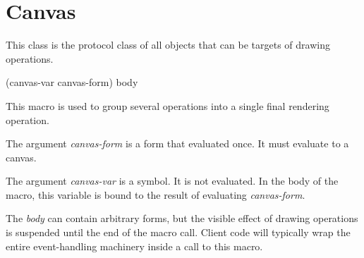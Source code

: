 \chapter{Canvas}
\label{chap-canvas}


This class is the protocol class of all objects that can be targets of
drawing operations.

 {(canvas-var canvas-form) \body body}

This macro is used to group several operations into a single final
rendering operation.

The argument \textit{canvas-form} is a form that evaluated once.  It
must evaluate to a canvas.

The argument \textit{canvas-var} is a symbol.  It is not evaluated.
In the body of the macro, this variable is bound to the result of
evaluating \textit{canvas-form}.

The \textit{body} can contain arbitrary forms, but the visible effect
of drawing operations is suspended until the end of the macro call.
Client code will typically wrap the entire event-handling machinery
inside a call to this macro.
